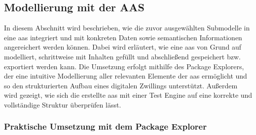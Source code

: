 


\newpage
\subsection{Modellierung mit der AAS}
In diesem Abschnitt wird beschrieben, wie die zuvor ausgewählten Submodelle in eine \acs{aas} integriert und mit konkreten Daten sowie semantischen Informationen angereichert werden können.
Dabei wird erläutert, wie eine \acs{aas} von Grund auf modelliert, schrittweise mit Inhalten gefüllt und abschließend gespeichert bzw. exportiert werden kann.  
Die Umsetzung erfolgt mithilfe des Package Explorers, der eine intuitive Modellierung aller relevanten Elemente der \acs{aas} ermöglicht und so den strukturierten Aufbau eines digitalen Zwillings unterstützt.
Außerdem wird gezeigt, wie sich die erstellte \acs{aas} mit einer Test Engine auf eine korrekte und vollständige Struktur überprüfen lässt.

\subsubsection{Praktische Umsetzung mit dem Package Explorer}

